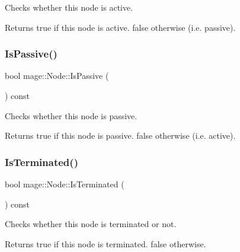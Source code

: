 Checks whether this node is active.

\begin{DoxyReturn}{Returns}
{\ttfamily true} if this node is active. {\ttfamily false} otherwise (i.\+e. passive). 
\end{DoxyReturn}
\hypertarget{classmage_1_1_node_a5fb6ac39c7e0d630944594cd5426f61a}{}\label{classmage_1_1_node_a5fb6ac39c7e0d630944594cd5426f61a} 
\subsubsection{\texorpdfstring{Is\+Passive()}{IsPassive()}}
{\footnotesize\ttfamily bool mage\+::\+Node\+::\+Is\+Passive (\begin{DoxyParamCaption}{ }\end{DoxyParamCaption}) const\hspace{0.3cm}{\ttfamily [noexcept]}}

Checks whether this node is passive.

\begin{DoxyReturn}{Returns}
{\ttfamily true} if this node is passive. {\ttfamily false} otherwise (i.\+e. active). 
\end{DoxyReturn}
\hypertarget{classmage_1_1_node_af669e446591ecb2d56b44769ba432172}{}\label{classmage_1_1_node_af669e446591ecb2d56b44769ba432172} 
\subsubsection{\texorpdfstring{Is\+Terminated()}{IsTerminated()}}
{\footnotesize\ttfamily bool mage\+::\+Node\+::\+Is\+Terminated (\begin{DoxyParamCaption}{ }\end{DoxyParamCaption}) const\hspace{0.3cm}{\ttfamily [noexcept]}}

Checks whether this node is terminated or not.

\begin{DoxyReturn}{Returns}
{\ttfamily true} if this node is terminated. {\ttfamily false} otherwise. 
\end{DoxyReturn}
\hypertarget{classmage_1_1_node_a65c1c55801a8e1d5354ac79d0c2fca6e}{}\label{classmage_1_1_node_a65c1c55801a8e1d5354ac79d0c2fca6e} 

